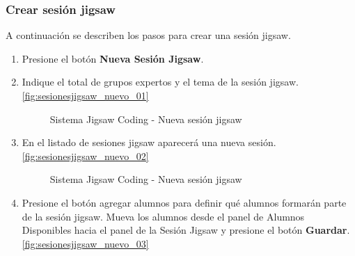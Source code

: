 \subsubsection{Crear sesión jigsaw}
A continuación se describen los pasos para crear una sesión jigsaw.
\begin{enumerate}
	\item Presione el botón \textbf{Nueva Sesión Jigsaw}.
	\item Indique el total de grupos expertos y el tema de la sesión jigsaw. \autoref{fig:sesionesjigsaw_nuevo_01}
	\begin{figure}
	\centering
	\caption[SJC Sesiones jigsaw]{Sistema Jigsaw Coding - Nueva sesión jigsaw}
	\label{fig:sesionesjigsaw_nuevo_01}
	\end{figure}
	\item En el listado de sesiones jigsaw aparecerá una nueva sesión.\autoref{fig:sesionesjigsaw_nuevo_02}
	\begin{figure}
	\centering
	\caption{Sistema Jigsaw Coding - Nueva sesión jigsaw}
	\label{fig:sesionesjigsaw_nuevo_02}
	\end{figure}
	\item Presione el botón agregar alumnos para definir qué alumnos formarán parte de la sesión jigsaw. Mueva los alumnos desde el panel de Alumnos Disponibles hacia el panel de la Sesión Jigsaw y presione el botón \textbf{Guardar}.  \autoref{fig:sesionesjigsaw_nuevo_03}
	\begin{figure}

\end{figure}
\end{enumerate}
